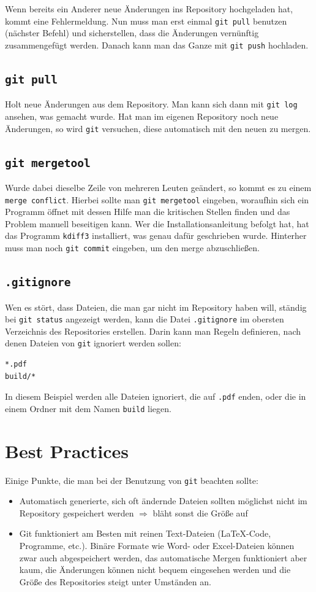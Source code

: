 Wenn bereits ein Anderer neue Änderungen ins Repository hochgeladen hat, kommt eine Fehlermeldung.
Nun muss man erst einmal \verb|git pull| benutzen (nächster Befehl) und sicherstellen, dass die Änderungen vernünftig zusammengefügt werden.
Danach kann man das Ganze mit \verb|git push| hochladen.

\subsection{\texttt{git pull}}
Holt neue Änderungen aus dem Repository.
Man kann sich dann mit \verb|git log| ansehen, was gemacht wurde.
Hat man im eigenen Repository noch neue Änderungen, so wird \texttt{git} versuchen, diese automatisch mit den neuen zu mergen.

\subsection{\texttt{git mergetool}}
Wurde dabei dieselbe Zeile von mehreren Leuten geändert, so kommt es zu einem \verb|merge conflict|.
Hierbei sollte man \verb|git mergetool| eingeben, woraufhin sich ein Programm öffnet mit dessen Hilfe man die kritischen Stellen finden und das Problem manuell beseitigen kann.
Wer die Installationsanleitung befolgt hat, hat das Programm \verb|kdiff3| installiert, was genau dafür geschrieben wurde.
Hinterher muss man noch \verb|git commit| eingeben, um den merge abzuschließen.

\subsection{\texttt{.gitignore}}
Wen es stört, dass Dateien, die man gar nicht im Repository haben will, ständig bei \verb|git status| angezeigt werden, kann die Datei \verb|.gitignore| im obersten Verzeichnis des Repositories erstellen.
Darin kann man Regeln definieren, nach denen Dateien von \verb|git| ignoriert werden sollen:
\begin{verbatim}
*.pdf
build/*
\end{verbatim}
In diesem Beispiel werden alle Dateien ignoriert, die auf \verb|.pdf| enden, oder die in einem Ordner mit dem Namen \verb|build| liegen.

\section{Best Practices}

Einige Punkte, die man bei der Benutzung von \texttt{git} beachten sollte:
\begin{itemize}
  \item Automatisch generierte, sich oft ändernde Dateien sollten möglichst nicht im Repository gespeichert werden
    $\Rightarrow$ bläht sonst die Größe auf
  \item Git funktioniert am Besten mit reinen Text-Dateien (\LaTeX-Code, Programme, etc.).
    Binäre Formate wie Word- oder Excel-Dateien können zwar auch abgespeichert werden, das automatische Mergen funktioniert aber kaum, die Änderungen können nicht bequem eingesehen werden und die Größe des Repositories steigt unter Umständen an.
\end{itemize}

